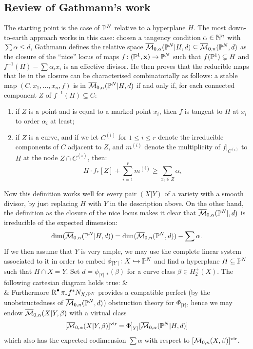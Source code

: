 \subsection{Review of Gathmann's work} The starting point is the case of $\mathbb P^N$ relative to a hyperplane $H$. The most down-to-earth approach works in this case: chosen a tangency condition $\alpha\in\mathbb{N}^n$ with $\sum\alpha\leq d$, Gathmann defines the relative space $\overline{\mathcal{M}}_{0,\alpha}(\mathbb P^N|H,d)\subseteq \overline{\mathcal{M}}_{0,n}(\mathbb P^N,d)$ as the closure of the ``nice'' locus of maps $f\colon(\mathbb P^1,\mathbf x)\rightarrow \mathbb P^N$ such that $f(\mathbb P^1)\subsetneq H$ and $f^{-1}(H)-\sum\alpha_ix_i$ is an effective divisor. He then proves that the reducible maps that lie in the closure can be characterised combinatorially as follows:
 a stable map $(C,x_1, \ldots, x_n,f)$ is in $\overline{\mathcal{M}}_{0,\alpha}(\mathbb P^N|H,d)$ if and only if, for each connected component $Z$ of $f^{-1}(H) \subseteq C$:
\begin{enumerate}
\item if $Z$ is a point and is equal to a marked point $x_i$, then $f$ is tangent to $H$ at $x_i$ to order $\alpha_i$ at least;
\item if $Z$ is a curve, and if we let $C^{(i)}$ for $1 \leq i \leq r$ denote the irreducible components of $C$ adjacent to $Z$, and $m^{(i)}$ denote the multiplicity of $f|_{C^{(i)}}$ to $H$ at the node $Z \cap C^{(i)}$, then:
\begin{equation} \label{Relative stable map internal component inequality} H \cdot f_* [Z] + \sum_{i=1}^r m^{(i)} \geq \sum_{x_i \in Z} \alpha_i \end{equation}
\end{enumerate}
Now this definition works well for every pair $(X|Y)$ of a variety with a smooth divisor, by just replacing $H$ with $Y$ in the description above. On the other hand, the definition as the closure of the nice locus makes it clear that $\overline{\mathcal{M}}_{0,\alpha}(\mathbb P^N|,d)$ is irreducible of the expected dimension: \[\dim(\overline{\mathcal{M}}_{0,\alpha}(\mathbb P^N|H,d))=\dim (\overline{\mathcal{M}}_{0,n}(\mathbb P^N,d))-\sum\alpha.\]
If we then assume that $Y$ is very ample, we may use the complete linear system associated to it in order to embed $\phi_{\lvert Y\rvert}\colon X\hookrightarrow\mathbb P^N$ and find a hyperplane $H\subseteq \mathbb P^N$ such that $H\cap X= Y$. Set $d=\phi_{\lvert Y\rvert,*}(\beta)$ for a curve class $\beta\in H_2^+(X)$. The following cartesian diagram holds true:
\bcd
{}\ar[d]\ar[r] &  \\
 \ar[r] & 
\ecd
Furthermore $\operatorname{R}^\bullet\pi_*f^*N_{X/\mathbb P^N}$ provides a compatible perfect (by the unobstructedness of $\overline{\mathcal{M}}_{0,n}(\mathbb P^N,d)$) obstruction theory for $\Phi_{\lvert Y\rvert}$, hence we may endow $\overline{\mathcal{M}}_{0,\alpha}(X|Y,\beta)$ with a virtual class
\[ [\overline{\mathcal{M}}_{0,\alpha}(X|Y,\beta)]^{\mathrm{vir}}=\Phi_{\lvert Y\rvert}^![\overline{\mathcal{M}}_{0,\alpha}(\mathbb P^N|H,d)] \]
which also has the expected codimension $\sum\alpha$ with respect to $[\overline{\mathcal{M}}_{0,n}(X,\beta)]^{\mathrm{vir}}$.

